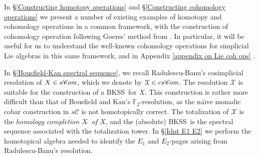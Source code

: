 \documentclass[11pt]{amsart} \renewcommand{\baselinestretch}{1.2}
\theoremstyle{plain}
\numberwithin{equation}{section} %
\theoremstyle{plain}
\numberwithin{equation}{chapter} %
\newcommand{\scrC}{\mathscr{C}}
\newcommand{\calx}{\mathcal{X}}
\newcommand{\calc}{\mathcal{C}}
\newcommand{\F}{\mathbb{F}}
\newcommand{\algs}{{\scrC\!\textit{\normalfont\textit{om}}}}
\newcommand{\Ftwo}{\F_2}
\newcommand{\BKSS}{BKSS}
\begin{document}
\begin{Introduction}
In \S\ref{Constructing homotopy operations} and \S\ref{Constructing cohomology operations} we present a number of existing examples of homotopy and cohomology operations in a common framework, with the construction of cohomology operation following Goerss' method from \cite{MR1089001}. In particular, it will be useful for us to understand the well-known cohomology operations for simplicial Lie algebras in this same framework, and in Appendix \ref{appendix on Lie coh ops} .




In \S\ref{Bousfield-Kan spectral sequence}, we recall Radulescu-Banu's \cite{Radulescu-Banu.pdf} cosimplicial resolution of $X\in s\algs$, which we denote by $\calx\in cs\algs$.
The resolution $\calx$ is suitable for the construction of a \BKSS\ for $X$. This construction is rather more difficult than that of Bousfield and Kan's $\Ftwo$-resolution, as the na\"{\i}ve monadic cobar construction in $s\calc$ is not homotopically correct.
The totalization of $\calx$ is the  \emph{homology completion $X\hat{\ }$ of $X$}, and the (absolute) \BKSS\ is the spectral sequence associated with the totalization tower. In  \S\ref{Idnt E1 E2} we perform the homotopical algebra needed to identify the $E_1$ and $E_2$-pages arising from Radulescu-Banu's resolution.
%
%






%
%


\end{Introduction}
\end{document}
